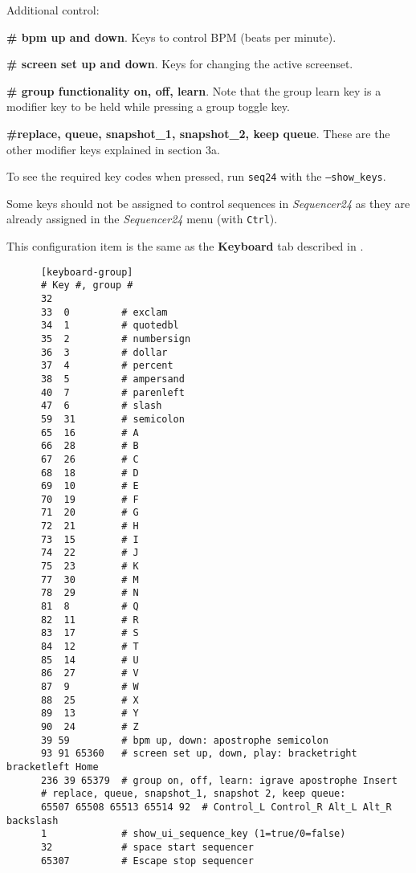    Additional control:

   \begin{enumber}
   	\item \textbf{\# bpm up and down}.
	      Keys to control BPM (beats per minute).
      \item \textbf{\# screen set up and down}.
	      Keys for changing the active screenset.
      \item \textbf{\# group functionality on, off, learn}.
	      Note that the group learn key is a modifier key to be held while 
         pressing a group toggle key.
      \item \textbf{\#replace, queue, snapshot\_1, snapshot\_2, keep queue}.
         These are the other modifier keys explained in section 3a.
   \end{enumber}

	To see the required key codes when pressed, run \texttt{seq24} with
   the \texttt{--show\_keys}.

   Some keys should not be assigned to control sequences in \textsl{Sequencer24} as
   they are already assigned in the \textsl{Sequencer24} menu (with \texttt{Ctrl}). 

   This configuration item is the same as the 
   \textbf{Keyboard} tab described in
   .

   \begin{verbatim}
      [keyboard-group]
      # Key #, group # 
      32
      33  0         # exclam
      34  1         # quotedbl
      35  2         # numbersign
      36  3         # dollar
      37  4         # percent
      38  5         # ampersand
      40  7         # parenleft
      47  6         # slash
      59  31        # semicolon
      65  16        # A
      66  28        # B
      67  26        # C
      68  18        # D
      69  10        # E
      70  19        # F
      71  20        # G
      72  21        # H
      73  15        # I
      74  22        # J
      75  23        # K
      77  30        # M
      78  29        # N
      81  8         # Q
      82  11        # R
      83  17        # S
      84  12        # T
      85  14        # U
      86  27        # V
      87  9         # W
      88  25        # X
      89  13        # Y
      90  24        # Z
      39 59         # bpm up, down: apostrophe semicolon
      93 91 65360   # screen set up, down, play: bracketright bracketleft Home
      236 39 65379  # group on, off, learn: igrave apostrophe Insert
      # replace, queue, snapshot_1, snapshot 2, keep queue:
      65507 65508 65513 65514 92  # Control_L Control_R Alt_L Alt_R backslash
      1             # show_ui_sequence_key (1=true/0=false)
      32            # space start sequencer
      65307         # Escape stop sequencer
   \end{verbatim}

